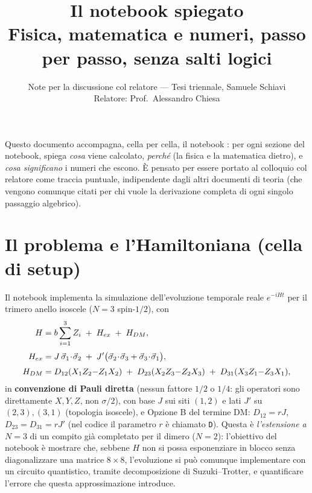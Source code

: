 \documentclass[11pt,a4paper]{article}
\title{Il notebook \texttt{\seqsplit{quantum\_simulation\_trimero\_anello\_trotter.ipynb}} spiegato\\
\large Fisica, matematica e numeri, passo per passo, senza salti logici}
\author{Note per la discussione col relatore --- Tesi triennale, Samuele Schiavi\\ Relatore: Prof.\ Alessandro Chiesa}
\date{}
\begin{document}
\maketitle
\tableofcontents

\bigskip
\noindent Questo documento accompagna, cella per cella, il notebook
\texttt{}:
per ogni sezione del notebook, spiega \emph{cosa} viene calcolato,
\emph{perché} (la fisica e la matematica dietro), e \emph{cosa
significano} i numeri che escono. È pensato per essere portato al
colloquio col relatore come traccia puntuale, indipendente dagli altri
documenti di teoria (che vengono comunque citati per chi vuole la
derivazione completa di ogni singolo passaggio algebrico).

\section{Il problema e l'Hamiltoniana (cella di setup)}

Il notebook implementa la simulazione dell'evoluzione temporale reale
$e^{-iHt}$ per il trimero anello isoscele ($N=3$ spin-$1/2$), con
\begin{align}
H &= b\sum_{i=1}^3 Z_i \;+\; H_{ex} \;+\; H_{DM}, \label{eq:H-full}\\[3pt]
H_{ex} &= J\,\vec\sigma_1\!\cdot\!\vec\sigma_2 \;+\; J'\big(\vec\sigma_2\!\cdot\!\vec\sigma_3+\vec\sigma_3\!\cdot\!\vec\sigma_1\big), \notag\\[3pt]
H_{DM} &= D_{12}(X_1Z_2{-}Z_1X_2) \;+\; D_{23}(X_2Z_3{-}Z_2X_3) \;+\; D_{31}(X_3Z_1{-}Z_3X_1), \notag
\end{align}
in \textbf{convenzione di Pauli diretta} (nessun fattore $1/2$ o $1/4$:
gli operatori sono direttamente $X,Y,Z$, non $\sigma/2$), con base $J$ sui
siti $(1,2)$ e lati $J'$ su $(2,3),(3,1)$ (topologia isoscele), e Opzione
B del termine DM: $D_{12}=rJ$, $D_{23}=D_{31}=rJ'$ (nel codice il
parametro $r$ è chiamato \texttt{D}). Questa è \emph{l'estensione a
$N=3$} di un compito già completato per il dimero ($N=2$): l'obiettivo
del notebook è mostrare che, sebbene $H$ non si possa esponenziare in
blocco senza diagonalizzare una matrice $8\times8$, l'evoluzione si può
comunque implementare con un circuito quantistico, tramite decomposizione
di Suzuki--Trotter, e quantificare l'errore che questa approssimazione
introduce.
\end{document}
